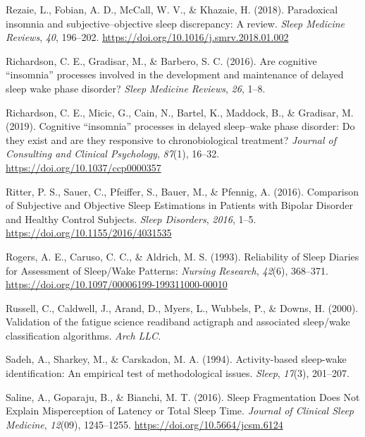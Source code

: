 \documentclass[
]{article}
\newlength{\cslhangindent}
\newenvironment{CSLReferences}[2] %
 {\begin{list}{}{%
  \setlength{\itemindent}{0pt}
  \setlength{\leftmargin}{0pt}
  \setlength{\parsep}{0pt}
  \ifodd #1
   \setlength{\leftmargin}{\cslhangindent}
   \setlength{\itemindent}{-1\cslhangindent}
  \fi
  \setlength{\itemsep}{#2\baselineskip}}}
 {\end{list}}
\begin{document}
\begin{CSLReferences}{1}{0}
Rezaie, L., Fobian, A. D., McCall, W. V., \& Khazaie, H. (2018). {Paradoxical insomnia and subjective--objective sleep discrepancy: A review}. \emph{Sleep Medicine Reviews}, \emph{40}, 196--202. \url{https://doi.org/10.1016/j.smrv.2018.01.002}

Richardson, C. E., Gradisar, M., \& Barbero, S. C. (2016). Are cognitive {``insomnia''} processes involved in the development and maintenance of delayed sleep wake phase disorder? \emph{Sleep Medicine Reviews}, \emph{26}, 1--8.

Richardson, C. E., Micic, G., Cain, N., Bartel, K., Maddock, B., \& Gradisar, M. (2019). Cognitive {``insomnia''} processes in delayed sleep--wake phase disorder: {Do} they exist and are they responsive to chronobiological treatment? \emph{Journal of Consulting and Clinical Psychology}, \emph{87}(1), 16--32. \url{https://doi.org/10.1037/ccp0000357}

Ritter, P. S., Sauer, C., Pfeiffer, S., Bauer, M., \& Pfennig, A. (2016). Comparison of {Subjective} and {Objective} {Sleep} {Estimations} in {Patients} with {Bipolar} {Disorder} and {Healthy} {Control} {Subjects}. \emph{Sleep Disorders}, \emph{2016}, 1--5. \url{https://doi.org/10.1155/2016/4031535}

Rogers, A. E., Caruso, C. C., \& Aldrich, M. S. (1993). Reliability of {Sleep} {Diaries} for {Assessment} of {Sleep}/{Wake} {Patterns}: \emph{Nursing Research}, \emph{42}(6), 368--371. \url{https://doi.org/10.1097/00006199-199311000-00010}

Russell, C., Caldwell, J., Arand, D., Myers, L., Wubbels, P., \& Downs, H. (2000). Validation of the fatigue science readiband actigraph and associated sleep/wake classification algorithms. \emph{Arch LLC}.

Sadeh, A., Sharkey, M., \& Carskadon, M. A. (1994). Activity-based sleep-wake identification: An empirical test of methodological issues. \emph{Sleep}, \emph{17}(3), 201--207.

Saline, A., Goparaju, B., \& Bianchi, M. T. (2016). Sleep {Fragmentation} {Does} {Not} {Explain} {Misperception} of {Latency} or {Total} {Sleep} {Time}. \emph{Journal of Clinical Sleep Medicine}, \emph{12}(09), 1245--1255. \url{https://doi.org/10.5664/jcsm.6124}


\end{CSLReferences}
\end{document}
